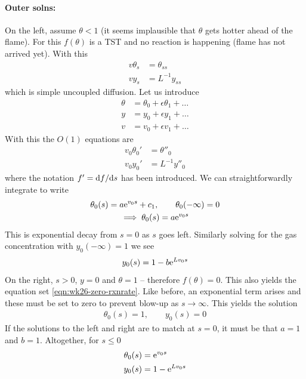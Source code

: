 \paragraph{Outer solns:} On the left, assume $\theta<1$ (it seems implausible that $\theta$ gets hotter ahead of the flame). For this $f(\theta)$ is a TST and no reaction is happening (flame has not arrived yet). With this
\begin{equation}\label{eqn:wk26-zero-rxnrate}
	\begin{split}
	v \theta_s &= \theta_{ss}\\
	v y_s &= L^{-1} y_{ss} 
	\end{split}
\end{equation}
which is simple uncoupled diffusion. Let us introduce
\begin{align*}
	\theta &= \theta_0 + \epsilon \theta_1 + \dots \\
	y &= y_0 + \epsilon y_1 + \dots \\
	v &= v_0 + \epsilon v_1 + \dots  
\end{align*}
With this the $O(1)$ equations are
\begin{align*}
	v_0 \theta_0' &= \theta''_0\\
	v_0 y_0' &= L^{-1} y''_0
\end{align*}
where the notation $f' = \mathrm{d} f / \mathrm{d} s$ has been introduced. We can straightforwardly integrate to write
\begin{gather*}
	\theta_0(s) = a \mathrm{e}^{v_0s} + c_1, \qquad \theta_0(-\infty) = 0 \\
	\implies \theta_0(s) = a \mathrm{e}^{v_0 s}
\end{gather*}
This is exponential decay from $s=0$ as $s$ goes left. Similarly solving for the gas concentration with $y_0(-\infty)=1$ we see
\begin{gather*}
	y_0(s) = 1 - b \mathrm{e}^{L v_0 s} 
\end{gather*}
On the right, $s>0$, $y=0$ and $\theta=1$ -- therefore $f(\theta)=0$. This also yields the equation set \ref{eqn:wk26-zero-rxnrate}. Like before, an exponential term arises and these must be set to zero to prevent blow-up as $s \rightarrow \infty$. This yields the solution
\begin{gather*}
	\theta_0(s) = 1, \qquad y_0(s) = 0
\end{gather*}
If the solutions to the left and right are to match at $s=0$, it must be that $a=1$ and $b=1$. Altogether, for $s \leq 0$
\begin{align*}
	\theta_0(s) &= \mathrm{e}^{v_0s} \\
	y_0(s) &= 1 - \mathrm{e}^{L v_0 s} 
\end{align*}
